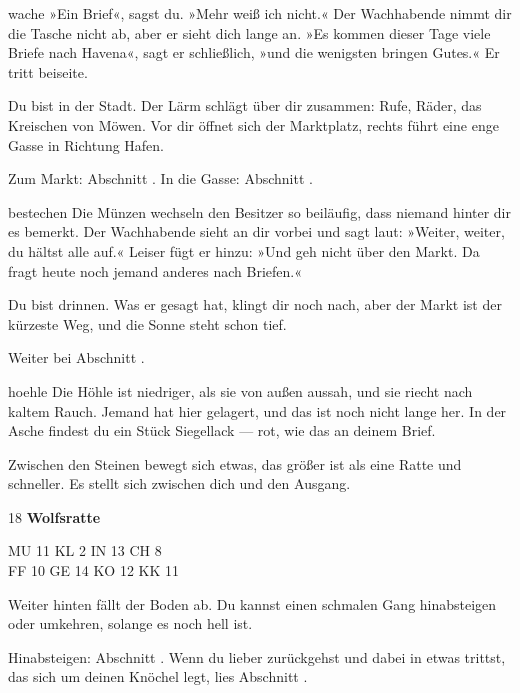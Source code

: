 \begin{soloBlock}{wache}
»Ein Brief«, sagst du. »Mehr weiß ich nicht.« Der Wachhabende nimmt dir die Tasche
nicht ab, aber er sieht dich lange an. »Es kommen dieser Tage viele Briefe nach
Havena«, sagt er schließlich, »und die wenigsten bringen Gutes.« Er tritt beiseite.

Du bist in der Stadt. Der Lärm schlägt über dir zusammen: Rufe, Räder, das Kreischen
von Möwen. Vor dir öffnet sich der Marktplatz, rechts führt eine enge Gasse in
Richtung Hafen.

Zum Markt: Abschnitt . In die Gasse: Abschnitt .
\end{soloBlock}

\begin{soloBlock}{bestechen}
Die Münzen wechseln den Besitzer so beiläufig, dass niemand hinter dir es bemerkt.
Der Wachhabende sieht an dir vorbei und sagt laut: »Weiter, weiter, du hältst alle
auf.« Leiser fügt er hinzu: »Und geh nicht über den Markt. Da fragt heute noch
jemand anderes nach Briefen.«

Du bist drinnen. Was er gesagt hat, klingt dir noch nach, aber der Markt ist der
kürzeste Weg, und die Sonne steht schon tief.

Weiter bei Abschnitt .
\end{soloBlock}

\begin{soloBlock}{hoehle}
Die Höhle ist niedriger, als sie von außen aussah, und sie riecht nach kaltem Rauch.
Jemand hat hier gelagert, und das ist noch nicht lange her. In der Asche findest du
ein Stück Siegellack — rot, wie das an deinem Brief.

Zwischen den Steinen bewegt sich etwas, das größer ist als eine Ratte und schneller.
Es stellt sich zwischen dich und den Ausgang.


\begin{dsaWerteFreiPortrait}[dsaportrait=grafiken/fiole]{18}
{\bfseries Wolfsratte}

\begin{dsaWerteblock}
MU 11 \quad KL 2 \quad IN 13 \quad CH 8\\
FF 10 \quad GE 14 \quad KO 12 \quad KK 11
\end{dsaWerteblock}
\end{dsaWerteFreiPortrait}

Weiter hinten fällt der Boden ab. Du kannst einen schmalen Gang hinabsteigen oder
umkehren, solange es noch hell ist.

Hinabsteigen: Abschnitt . Wenn du lieber zurückgehst und dabei
in etwas trittst, das sich um deinen Knöchel legt, lies Abschnitt .
\end{soloBlock}


